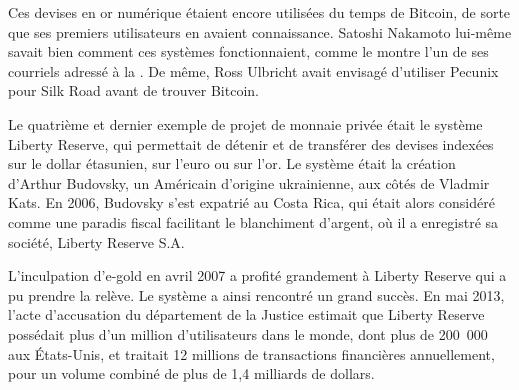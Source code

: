 Ces devises en or numérique étaient encore utilisées du temps de Bitcoin, de sorte que ses premiers utilisateurs en avaient connaissance. Satoshi Nakamoto lui-même savait bien comment ces systèmes fonctionnaient, comme le montre l'un de ses courriels adressé à la . De même, Ross Ulbricht avait envisagé d'utiliser Pecunix pour Silk Road avant de trouver Bitcoin.


Le quatrième et dernier exemple de projet de monnaie privée était le système Liberty Reserve, qui permettait de détenir et de transférer des devises indexées sur le dollar étasunien, sur l'euro ou sur l'or. Le système était la création d'Arthur Budovsky, un Américain d'origine ukrainienne, aux côtés de Vladmir Kats. En 2006, Budovsky s'est expatrié au Costa Rica, qui était alors considéré comme une paradis fiscal facilitant le blanchiment d'argent, où il a enregistré sa société, Liberty Reserve S.A.  %

L'inculpation d'e-gold en avril 2007 a profité grandement à Liberty Reserve qui a pu prendre la relève. Le système a ainsi rencontré un grand succès. En mai  2013, l'acte d'accusation du département de la Justice estimait que Liberty Reserve possédait plus d'un million d’utilisateurs dans le monde, dont plus de 200~000 aux États-Unis, et traitait 12 millions de transactions financières annuellement, pour un volume combiné de plus de 1,4 milliards de dollars.

